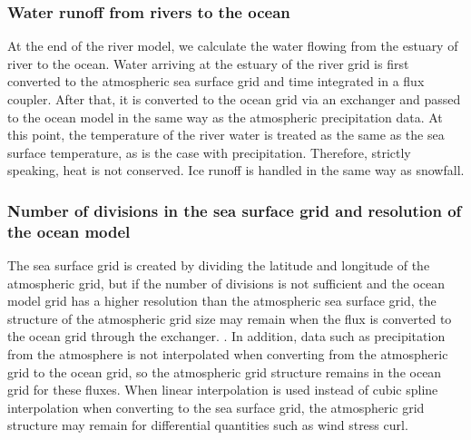 \hypertarget{water-runoff-from-rivers-to-the-ocean}{%
\subsubsection{Water runoff from rivers to the
ocean}\label{water-runoff-from-rivers-to-the-ocean}}

At the end of the river model, we calculate the water flowing from the
estuary of river to the ocean. Water arriving at the estuary of the
river grid is first converted to the atmospheric sea surface grid and
time integrated in a flux coupler. After that, it is converted to the
ocean grid via an exchanger and passed to the ocean model in the same
way as the atmospheric precipitation data. At this point, the
temperature of the river water is treated as the same as the sea surface
temperature, as is the case with precipitation. Therefore, strictly
speaking, heat is not conserved. Ice runoff is handled in the same way
as snowfall.

\hypertarget{number-of-divisions-in-the-sea-surface-grid-and-resolution-of-the-ocean-model}{%
\subsubsection{Number of divisions in the sea surface grid and
resolution of the ocean
model}\label{number-of-divisions-in-the-sea-surface-grid-and-resolution-of-the-ocean-model}}

The sea surface grid is created by dividing the latitude and longitude
of the atmospheric grid, but if the number of divisions is not
sufficient and the ocean model grid has a higher resolution than the
atmospheric sea surface grid, the structure of the atmospheric grid size
may remain when the flux is converted to the ocean grid through the
exchanger. . In addition, data such as precipitation from the atmosphere
is not interpolated when converting from the atmospheric grid to the
ocean grid, so the atmospheric grid structure remains in the ocean grid
for these fluxes. When linear interpolation is used instead of cubic
spline interpolation when converting to the sea surface grid, the
atmospheric grid structure may remain for differential quantities such
as wind stress curl.
